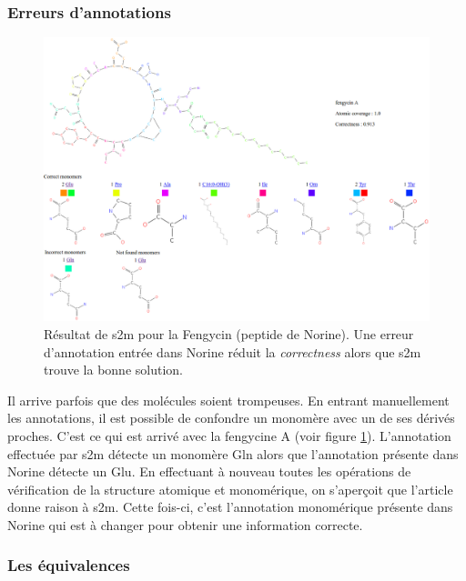 \subsubsection{Erreurs d'annotations}

\begin{figure}[h!]
  \begin{center}
    \includegraphics[width=450px]{Figures/s2m/results/fengycin.png}
    \caption{\label{fengycin}Résultat de s2m pour la Fengycin (peptide de Norine).
    Une erreur d'annotation entrée dans Norine réduit la \textit{correctness} alors que s2m trouve la bonne solution.}
  \end{center}
\end{figure}

Il arrive parfois que des molécules soient trompeuses.
En entrant manuellement les annotations, il est possible de confondre un monomère avec un de ses dérivés proches.
C'est ce qui est arrivé avec la fengycine A (voir figure \ref{fengycin}).
L'annotation effectuée par s2m détecte un monomère Gln alors que l'annotation présente dans Norine détecte un Glu.
En effectuant à nouveau toutes les opérations de vérification de la structure atomique et monomérique, on s'aperçoit que l'article~\cite{wu_nonribosomal_2007} donne raison à s2m.
Cette fois-ci, c'est l'annotation monomérique présente dans Norine qui est à changer pour obtenir une information correcte.


\subsubsection{Les équivalences}

